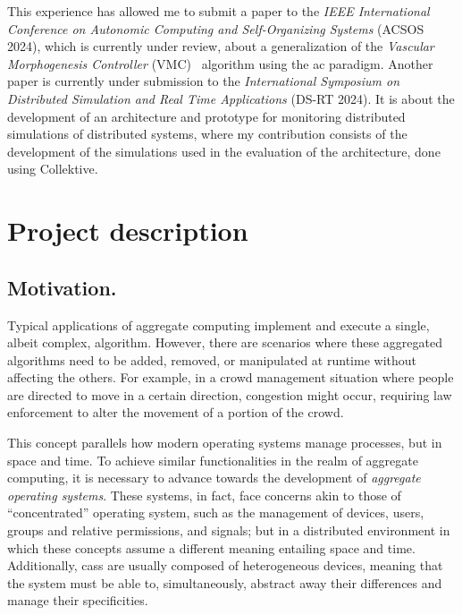 \documentclass[12pt, a4paper]{article}
\begin{document}
This experience has allowed me to submit a paper to the \emph{IEEE International Conference on Autonomic Computing and Self-Organizing Systems} (ACSOS 2024),
which is currently under review,
about a generalization of the \emph{Vascular Morphogenesis Controller} (VMC)~\cite{ZahadatHS17} algorithm using the \ac{ac} paradigm.
%
Another paper is currently under submission to the \emph{International Symposium on Distributed Simulation and Real Time Applications} (DS-RT 2024).
%
It is about the development of an architecture and prototype
for monitoring distributed simulations of distributed systems,
where my contribution consists of the development of the simulations used in the evaluation of the architecture,
done using Collektive.

\section{Project description}
\label{sec:project-description}

\subsection{Motivation.}
\label{subsec:motivation.}

Typical applications of aggregate computing implement and execute a single, albeit complex, algorithm.
%
However,
there are scenarios where these aggregated algorithms need to be added, removed,
or manipulated at runtime without affecting the others.
%
For example,
in a crowd management situation where people are directed to move in a certain direction,
congestion might occur,
requiring law enforcement to alter the movement of a portion of the crowd.

This concept parallels how modern operating systems manage processes, but in space and time.
%
To achieve similar functionalities in the realm of aggregate computing,
it is necessary to advance towards the development of \emph{aggregate operating systems}.
%
These systems, in fact,
face concerns akin to those of ``concentrated'' operating system,
such as the management of devices, users, groups and relative permissions, and signals;
but in a distributed environment in which these concepts assume a different meaning
entailing space and time.
%
Additionally,
\acp{cas} are usually composed of heterogeneous devices,
meaning that the system must be able to,
simultaneously,
abstract away their differences and manage their specificities.
\end{document}
